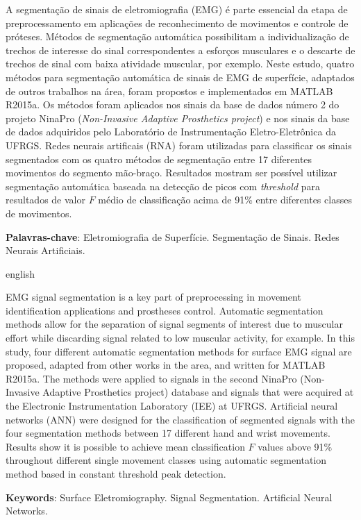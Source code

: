 \setlength{\absparsep}{18pt} %
\begin{resumo}

	A segmentação de sinais de eletromiografia (EMG) é parte essencial da etapa de preprocessamento em aplicações de reconhecimento de movimentos e controle de próteses. Métodos de segmentação automática possibilitam a individualização de trechos de interesse do sinal correspondentes a esforços musculares e o descarte de trechos de sinal com baixa atividade muscular, por exemplo. Neste estudo, quatro métodos para segmentação automática de sinais de EMG de superfície, adaptados de outros trabalhos na área, foram propostos e implementados em MATLAB R2015a. Os métodos foram aplicados nos sinais da base de dados número 2 do projeto NinaPro (\emph{Non-Invasive Adaptive Prosthetics project}) e nos sinais da base de dados adquiridos pelo Laboratório de Instrumentação Eletro-Eletrônica da UFRGS. Redes neurais artificais (RNA) foram utilizadas para classificar os sinais segmentados com os quatro métodos de segmentação entre 17 diferentes movimentos do segmento mão-braço. Resultados mostram ser possível utilizar segmentação automática baseada na detecção de picos com \emph{threshold} para resultados de valor $F$ médio de classificação acima de 91\% entre diferentes classes de movimentos.
	

	\vspace{\onelineskip}
	\textbf{Palavras-chave}: Eletromiografia de Superfície. Segmentação de Sinais. Redes Neurais Artificiais.
\end{resumo}

\begin{resumo}[Abstract]
 \begin{otherlanguage*}{english}
	
	EMG signal segmentation is a key part of preprocessing in movement identification applications and prostheses control. Automatic segmentation methods allow for the separation of signal segments of interest due to muscular effort while discarding signal related to low muscular activity, for example. In this study, four different automatic segmentation methods for surface EMG signal are proposed, adapted from other works in the area, and written for MATLAB R2015a. The methods were applied to signals in the second NinaPro (Non-Invasive Adaptive Prosthetics project) database and signals that were acquired at the Electronic Instrumentation Laboratory (IEE) at UFRGS. Artificial neural networks (ANN) were designed for the classification of segmented signals with the four segmentation methods between 17 different hand and wrist movements. Results show it is possible to achieve mean classification $F$ values above 91\% throughout different single movement classes using automatic segmentation method based in constant threshold peak detection.
	
   \vspace{\onelineskip}
   \noindent 
   \textbf{Keywords}: Surface Eletromiography. Signal Segmentation. Artificial Neural Networks.
 \end{otherlanguage*}
\end{resumo}

